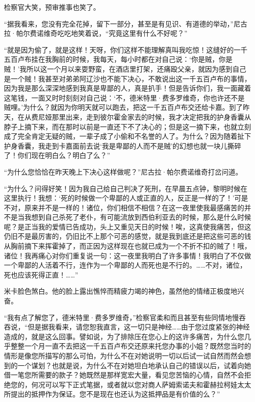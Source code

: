 \par 检察官大笑，预审推事也笑了。
\par “据我看来，您没有完全花掉，留下一部分，甚至是有见识、有道德的举动，”尼古拉·帕尔费诺维奇吃吃地笑着说，“究竟这里有什么不好呢？”
\par “就是因为偷了，就是这样！天呀，你们这样不能理解真叫我吃惊！这缝好的一千五百卢布挂在我胸前的时候，我每天，每小时都在对自己说：‘你是贼，你是贼！’我所以这一个月以来耍野蛮，在酒店里打架，还痛殴父亲，就因为感到自己是一个贼！我甚至对弟弟阿辽沙也不能下决心，不敢说出这一千五百卢布的事情，因为我是那么深深地感到我真是卑鄙的人，真是扒手！但是告诉你们，我一面藏着这笔钱，一面又时时刻刻对自己说：‘不，德米特里·费多罗维奇，你也许还不是贼哩。’为什么？就因为你明天就可以跑去，把这一千五百卢布交还给卡嘉。到了昨天，在从费尼娅那里出来，走到彼尔霍金家去的时候，我才决定把我的护身香囊从脖子上摘下来，而在那时以前是一直还下不了决心的；但是这一摘下来，也就立刻成了完全肯定无疑的贼，一辈子成了小偷和不名誉的人了。为什么？因为随着扯下护身香囊，我走到卡嘉面前去说‘我是卑鄙的人而不是贼’的幻想也就一块儿撕碎了！你们现在明白么？明白了么？”
\par “为什么您恰恰在昨天晚上下决心这样做呢？”尼古拉·帕尔费诺维奇打岔问道。
\par “为什么？问得好笑！因为我自己给自己判决了死刑，在早晨五点钟，黎明时候在这里执行！我想：‘死的时候做一个卑鄙的人或正直的人，反正是一样的了！’可是不对，原来并不是一样的！诸位，你们相信不相信？在这一夜里使我最感痛苦的并不是当我想到自己杀死了老仆，有可能流放到西伯利亚去的时候，那么是什么时候呢？是正当我的爱情已告成功，头上又重见天日的时候！唉，这真使我痛苦，但这仍旧不是最厉害的，仍旧比不上那个可恶的感觉，就是我到底还是把这些可恶的钱从胸前摘下来挥霍掉了，而正因为这样现在也就已成为一个不折不扣的贼了！哦，诸位！我再痛心对你们重复说一句：这一夜里我明白了许多事情！我明白了不仅做一个卑鄙的人活着不行，连作为一个卑鄙的人而死也是不行的。……不对，诸位，死也应该死得正直！……”
\par 米卡脸色煞白。他的脸上露出憔悴而精疲力竭的神色，虽然他的情绪正极度地兴奋。
\par “我有点了解您了，德米特里·费多罗维奇，”检察官柔和而且甚至有些同情地慢吞吞说，“但是据我看来，请您恕我直言，这一切只是神经……由于您过度紧张的神经造成的，就是这么回事。譬如说，为了排除压在您心上的这许多痛苦，为什么您几乎整整一个月一直不去把这一千五百卢布交还原来托您办事的小姐？既然您当时的情形是像您所描写的那么可怕，为什么不在对她说明一切以后试一试自然而然会想到的一个谋划？也就是说，为什么不在对她坦白地承认自己的错误以后，试着向她借一笔您所需要的款子？她既然是那样宽宏大量，看见您苦恼的心情，自然不会拒绝您的，何况可以写下正式笔据，或者就以您对商人萨姆索诺夫和霍赫拉柯娃太太所提出的抵押作为保证。您不是现在也还认为这抵押品是有价值的么？”
